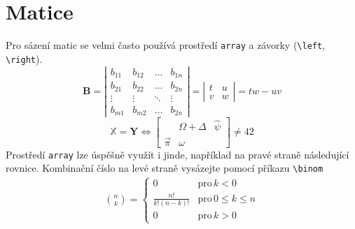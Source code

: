 \documentclass[11pt, a4paper, twocolumn]{article}
\begin{document}
\section{Matice}
Pro sázení matic se velmi často používá prostředí \texttt{array}
a závorky (\verb|\left|, \verb|\right|).
$$
\mathbf{B} =\left| \begin{array}{cccc}
        b_{11} & b_{12} & \hdots & b_{1n} \\
        b_{21} & b_{22} & \hdots   & b_{2n} \\
        \vdots & \vdots & \ddots & \vdots  \\
        b_{m1} & b_{m2} & \hdots   & b_{2n} 
    \end{array} 
    \right|
     = \left| \begin{array}{cc}
        t & u \\
        v & w 
    \end{array}\right| = tw - uv 
$$
$$  
\mathbb{X} =\mathbf{Y} \Longleftrightarrow 
    \left[ 
    \begin{array}{ccc}
        & \Omega + \Delta & \hat{\psi} \\
        \vec{\pi} & \omega &
    \end{array} \right] 
    \neq 42
$$
Prostředí \texttt{array} lze úspěšně využít i jinde, například na pravé straně 
následující rovnice. Kombinační číslo na levé straně vysázejte pomocí příkazu
\verb|\binom|
\begin{align*}
    \binom{n}{k} = 
    \left\{ 
    \begin{array}{cl}
    0 & \textrm{pro}\, k < 0 \\
    \frac{n!}{k!(n-k)!} & \textrm{pro}\, 0 \le k \le n \\
    0 & \textrm{pro}\, k > 0
    \end{array} \right.
\end{align*}
\end{document}
